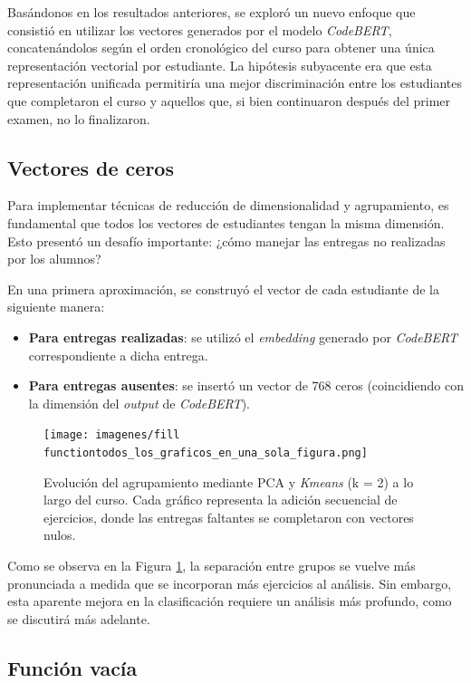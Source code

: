 \documentclass[11pt,a4paper,twoside,openany]{tesis}
\begin{document}
Basándonos en los resultados anteriores, se exploró un nuevo enfoque que consistió en utilizar los vectores generados por el modelo \emph{CodeBERT}, concatenándolos según el orden cronológico del curso para obtener una única representación vectorial por estudiante. La hipótesis subyacente era que esta representación unificada permitiría una mejor discriminación entre los estudiantes que completaron el curso y aquellos que, si bien continuaron después del primer examen, no lo finalizaron.

\subsection{Vectores de ceros}

Para implementar técnicas de reducción de dimensionalidad y agrupamiento, es fundamental que todos los vectores de estudiantes tengan la misma dimensión. Esto presentó un desafío importante: ¿cómo manejar las entregas no realizadas por los alumnos?

En una primera aproximación, se construyó el vector de cada estudiante de la siguiente manera:

\begin{itemize}
    \item \textbf{Para entregas realizadas}: se utilizó el \emph{embedding} generado por \emph{CodeBERT} correspondiente a dicha entrega.
    \item\textbf{Para entregas ausentes}: se insertó un vector de 768 ceros (coincidiendo con la dimensión del \emph{output} de \emph{CodeBERT}).
\end{itemize}

\begin{figure}[H]
    \centering
    \texttt{[image: imagenes/fill functiontodos\_los\_graficos\_en\_una\_sola\_figura.png]}
    \caption{Evolución del agrupamiento mediante PCA y \emph{Kmeans} (k = 2) a lo largo del curso. Cada gráfico representa la adición secuencial de ejercicios, donde las entregas faltantes se completaron con vectores nulos.}
    \label{fig: zeros}
\end{figure}

Como se observa en la Figura \ref{fig: zeros}, la separación entre grupos se vuelve más pronunciada a medida que se incorporan más ejercicios al análisis. Sin embargo, esta aparente mejora en la clasificación requiere un análisis más profundo, como se discutirá más adelante.

\subsection{Función vacía}
\end{document}
